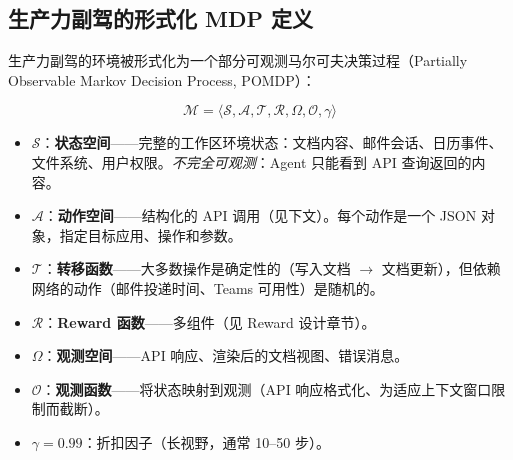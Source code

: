 \subsection{生产力副驾的形式化 MDP 定义}
\label{formal-mdp-definition-for-a-productivity-co-pilot}

生产力副驾的环境被形式化为一个部分可观测马尔可夫决策过程（Partially Observable Markov Decision Process, POMDP）：

\begin{equation}
\boxed{\mathcal{M} = \langle \mathcal{S}, \mathcal{A}, \mathcal{T}, \mathcal{R}, \Omega, \mathcal{O}, \gamma \rangle}
\end{equation}

\begin{itemize}
  \item $\mathcal{S}$：\textbf{状态空间}——完整的工作区环境状态：文档内容、邮件会话、日历事件、文件系统、用户权限。\emph{不完全可观测}：Agent 只能看到 API 查询返回的内容。
  \item $\mathcal{A}$：\textbf{动作空间}——结构化的 API 调用（见下文）。每个动作是一个 JSON 对象，指定目标应用、操作和参数。
  \item $\mathcal{T}$：\textbf{转移函数}——大多数操作是确定性的（写入文档 $\rightarrow$ 文档更新），但依赖网络的动作（邮件投递时间、Teams 可用性）是随机的。
  \item $\mathcal{R}$：\textbf{Reward 函数}——多组件（见 Reward 设计章节）。
  \item $\Omega$：\textbf{观测空间}——API 响应、渲染后的文档视图、错误消息。
  \item $\mathcal{O}$：\textbf{观测函数}——将状态映射到观测（API 响应格式化、为适应上下文窗口限制而截断）。
  \item $\gamma = 0.99$：折扣因子（长视野，通常 10--50 步）。
\end{itemize}

